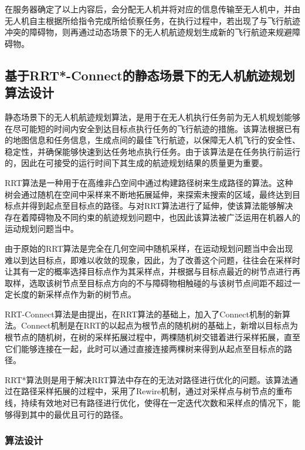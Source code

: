 在服务器确定了以上内容后，会分配无人机并将对应的信息传输至无人机中，并由无人机自主根据所给指令完成所给侦察任务，在执行过程中，若出现了与飞行航迹冲突的障碍物，则再通过动态场景下的无人机航迹规划生成新的飞行航迹来规避障碍物。

\subsection{基于RRT*-Connect的静态场景下的无人机航迹规划算法设计}

静态场景下的无人机航迹规划算法，是用于在无人机执行任务前为无人机规划能够在尽可能短的时间内安全到达目标点执行任务的飞行航迹的措施。该算法根据已有的地图信息和任务信息，生成点间的最佳飞行航迹，以保障无人机飞行的安全性、稳定性，并确保能够快速到达任务地点执行任务。由于该算法是在任务执行前运行的，因此在可接受的运行时间下其生成的航迹规划结果的质量更为重要。

RRT算法是一种用于在高维非凸空间中通过构建路径树来生成路径的算法。这种树会通过随机在空间中采样来不断地拓展延伸，来探索未搜索的区域，最终达到目标点并得到起点至目标点的路径。\citet{lavalle1998RapidlyExploringRandomTrees}与\citet{lavalle2001RandomizedKinodynamicPlanninga}对RRT算法进行了延伸，使该算法能够解决存在着障碍物及不同约束的航迹规划问题中，也因此该算法被广泛运用在机器人的运动规划问题当中。

由于原始的RRT算法是完全在几何空间中随机采样，在运动规划问题当中会出现难以到达目标点，即难以收敛的现象，因此，为了改善这个问题，往往会在采样时让其有一定的概率选择目标点作为其采样点，并根据与目标点最近的树节点进行再取样，选取该树节点至目标点方向的不与障碍物相触碰的与该树节点间距不超过一定长度的新采样点作为新的树节点。

RRT-Connect算法是由\citet{kuffner2000RRTconnectEfficientApproachb}提出，在RRT算法的基础上，加入了Connect机制的新算法。Connect机制是在RRT的以起点为根节点的随机树的基础上，新增以目标点为根节点的随机树，在树的采样拓展过程中，两棵随机树交错着进行采样拓展，直至它们能够连接在一起，此时可以通过直接连接两棵树来得到从起点至目标点的路径。

RRT*算法则是用于解决RRT算法中存在的无法对路径进行优化的问题。该算法通过在路径采样拓展的过程中，采用了Rewire机制，通过对采样点与树节点的重布线，持续有效地对已有路径进行优化，使得在一定迭代次数和采样点的情况下，能够得到其中的最优且可行的路径。

\subsubsection{算法设计}


